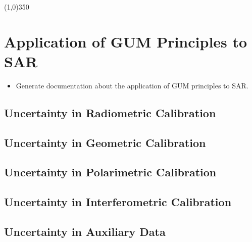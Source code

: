 \documentclass[pdftex,12pt,a4paper,oneside]{article}
\numberwithin{equation}{section} %
\begin{document}


\tableofcontents
\vspace{2cm}

\begin{center}
\line(1,0){350}
\end{center}

\newpage



\section{Application of GUM Principles to SAR}

\begin{itemize}
  \item Generate documentation about the application of GUM principles to SAR.
\end{itemize}

\lipsum[1]


\subsection{Uncertainty in Radiometric Calibration}

\lipsum[2-3]

\subsection{Uncertainty in Geometric Calibration}

\subsection{Uncertainty in Polarimetric Calibration}

\subsection{Uncertainty in Interferometric Calibration}

\subsection{Uncertainty in Auxiliary Data}
\end{document}
